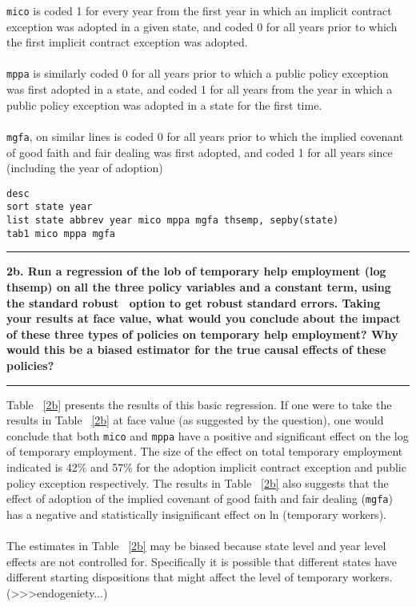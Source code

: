 \documentclass[12pt]{article}
\newcommand\question[1]{\vspace{1em}\hrule\vspace{1em}\textbf{#1}\vspace{1em}\hrule\vspace{1em}}
\begin{document}
\noindent \texttt{mico} is coded 1 for every year from the first year in which an implicit contract exception was adopted in a given state, and coded 0 for all years prior to which the first implicit contract exception was adopted. \\\\
\texttt{mppa} is similarly coded 0 for all years prior to which a public policy exception was first adopted in a state, and coded 1 for all years from the year in which a public policy exception was adopted in a state for the first time.\\\\
\texttt{mgfa}, on similar lines is coded 0 for all years prior to which the implied covenant of good faith and fair dealing was first adopted, and coded 1 for all years since (including the year of adoption)

\begin{lstlisting}
desc
sort state year
list state abbrev year mico mppa mgfa thsemp, sepby(state)
tab1 mico mppa mgfa
\end{lstlisting}

\newpage
\question{2b. Run a regression of the lob of temporary help employment (log thsemp) on all the three policy variables and a constant term, using the standard \textquotesingle robust \textquotesingle \ option to get robust standard errors. Taking your results at face value, what would you conclude about the impact of these three types of policies on temporary help employment? Why would this be a biased estimator for the true causal effects of these policies?}

\noindent Table ~\ref{2b} presents the results of this basic regression. If one were to take the results in Table ~\ref{2b} at face value (as suggested by the question), one would conclude that both \texttt{mico} and \texttt{mppa} have a positive and significant effect on the log of temporary employment. The size of the effect on total temporary employment indicated is 42\% and 57\% for the adoption implicit contract exception and public policy exception respectively. The results in Table ~\ref{2b} also suggests that the effect of adoption of the implied covenant of good faith and fair dealing (\texttt{mgfa}) has a negative and statistically insignificant effect on ln (temporary workers).\\\\
The estimates in Table ~\ref{2b} may be biased because state level and year level effects are not controlled for. Specifically it is possible that different states have different starting dispositions that might affect the level of temporary workers. (>>>endogeniety...)
\end{document}
